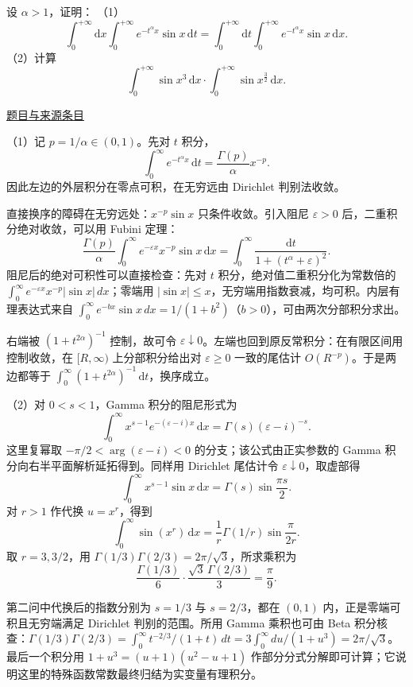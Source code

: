 \documentclass[UTF8,12pt,a4paper,fontset=fandol]{ctexart}
\begin{document}
\begin{example}[来源序号5]\label{ex:ch07-13th-A:5}\label{pr:ch07-13th-A:5}

设 $\alpha>1$，证明：
（1）\[
\int_{0}^{+\infty}\mathrm{d}x\int_{0}^{+\infty}e^{-t^{\alpha}x}\sin x\,\mathrm{d}t=\int_{0}^{+\infty}\mathrm{d}t\int_{0}^{+\infty}e^{-t^{\alpha}x}\sin x\,\mathrm{d}x.
\]
（2）计算
\[
\int_{0}^{+\infty}\sin x^{3}\,\mathrm{d}x\cdot\int_{0}^{+\infty}\sin x^{\frac{3}{2}}\,\mathrm{d}x.
\]

\par\href{https://github.com/lzxcr/cmc-mathematics/blob/64916fa1fdbc3e444a652eca204d5669058ee321/src/problems/preliminary/13/05.md}{题目与来源条目}

\end{example}

\begin{solve}\label{ans:ch07-13th-A:5}

（1）记 $p=1/\alpha\in(0,1)$。先对 $t$ 积分，
\[
\int_0^\infty e^{-t^\alpha x}\,\mathrm dt
=\frac{\Gamma(p)}\alpha x^{-p}.
\]
因此左边的外层积分在零点可积，在无穷远由 Dirichlet 判别法收敛。

直接换序的障碍在无穷远处：$x^{-p}\sin x$ 只条件收敛。引入阻尼 $\varepsilon>0$ 后，二重积分绝对收敛，可以用 Fubini 定理：
\[
\frac{\Gamma(p)}\alpha\int_0^\infty e^{-\varepsilon x}x^{-p}\sin x\,\mathrm dx
=\int_0^\infty\frac{\mathrm dt}{1+(t^\alpha+\varepsilon)^2}.
\]
阻尼后的绝对可积性可以直接检查：先对 $t$ 积分，绝对值二重积分化为常数倍的 $\int_0^\infty e^{-\varepsilon x}x^{-p}|\sin x|\,dx$；零端用 $|\sin x|\le x$，无穷端用指数衰减，均可积。内层有理表达式来自 $\int_0^\infty e^{-bx}\sin x\,dx=1/(1+b^2)$（$b>0$），可由两次分部积分求出。

右端被 $(1+t^{2\alpha})^{-1}$ 控制，故可令 $\varepsilon\downarrow0$。左端也回到原反常积分：在有限区间用控制收敛，在 $[R,\infty)$ 上分部积分给出对 $\varepsilon\geq0$ 一致的尾估计 $O(R^{-p})$。于是两边都等于 $\int_0^\infty(1+t^{2\alpha})^{-1}\,\mathrm dt$，换序成立。

（2）对 $0<s<1$，Gamma 积分的阻尼形式为
\[
\int_0^\infty x^{s-1}e^{-(\varepsilon-i)x}\,\mathrm dx
=\Gamma(s)(\varepsilon-i)^{-s}.
\]
这里复幂取 $-\pi/2<\arg(\varepsilon-i)<0$ 的分支；该公式由正实参数的 Gamma 积分向右半平面解析延拓得到。同样用 Dirichlet 尾估计令 $\varepsilon\downarrow0$，取虚部得
\[
\int_0^\infty x^{s-1}\sin x\,\mathrm dx
=\Gamma(s)\sin\frac{\pi s}{2}.
\]
对 $r>1$ 作代换 $u=x^r$，得到
\[
\int_0^\infty\sin(x^r)\,\mathrm dx
=\frac1r\Gamma(1/r)\sin\frac{\pi}{2r}.
\]
取 $r=3,3/2$，用 $\Gamma(1/3)\Gamma(2/3)=2\pi/\sqrt3$，所求乘积为
\[
\frac{\Gamma(1/3)}6\cdot
\frac{\sqrt3\,\Gamma(2/3)}3=\frac\pi9.
\]

第二问中代换后的指数分别为 $s=1/3$ 与 $s=2/3$，都在 $(0,1)$ 内，正是零端可积且无穷端满足 Dirichlet 判别的范围。所用 Gamma 乘积也可由 Beta 积分核查：$\Gamma(1/3)\Gamma(2/3)=\int_0^\infty t^{-2/3}/(1+t)\,dt=3\int_0^\infty du/(1+u^3)=2\pi/\sqrt3$。最后一个积分用 $1+u^3=(u+1)(u^2-u+1)$ 作部分分式分解即可计算；它说明这里的特殊函数常数最终归结为实变量有理积分。

\end{solve}
\end{document}
